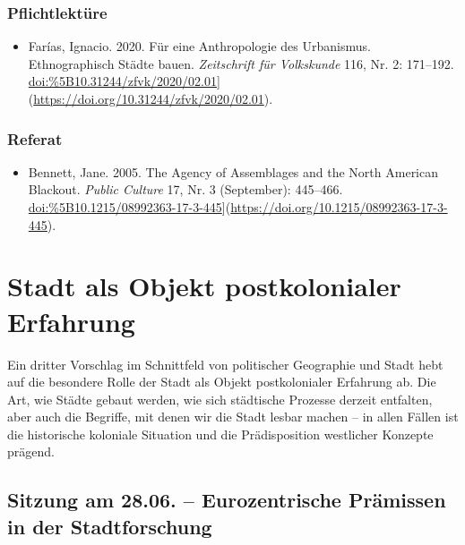 \documentclass[
]{article}
\providecommand{\tightlist}{%
  \setlength{\itemsep}{0pt}\setlength{\parskip}{0pt}}
\begin{document}
\hypertarget{pflichtlektuxfcre-8}{%
\subsubsection*{Pflichtlektüre}\label{pflichtlektuxfcre-8}}

\begin{itemize}
\tightlist
\item
  Farías, Ignacio. 2020. Für eine Anthropologie des Urbanismus. Ethnographisch Städte bauen. \emph{Zeitschrift für Volkskunde} 116, Nr. 2: 171--192. \url{doi:\%5B10.31244/zfvk/2020/02.01}{]}(\url{https://doi.org/10.31244/zfvk/2020/02.01}).
\end{itemize}

\hypertarget{referat-8}{%
\subsubsection*{Referat}\label{referat-8}}

\begin{itemize}
\tightlist
\item
  Bennett, Jane. 2005. The Agency of Assemblages and the North American Blackout. \emph{Public Culture} 17, Nr. 3 (September): 445--466. \url{doi:\%5B10.1215/08992363-17-3-445}{]}(\url{https://doi.org/10.1215/08992363-17-3-445}).
\end{itemize}

\pagebreak

\hypertarget{stadt-als-objekt-postkolonialer-erfahrung}{%
\section{Stadt als Objekt postkolonialer Erfahrung}\label{stadt-als-objekt-postkolonialer-erfahrung}}

Ein dritter Vorschlag im Schnittfeld von politischer Geographie und Stadt hebt auf die besondere Rolle der Stadt als Objekt postkolonialer Erfahrung ab. Die Art, wie Städte gebaut werden, wie sich städtische Prozesse derzeit entfalten, aber auch die Begriffe, mit denen wir die Stadt lesbar machen -- in allen Fällen ist die historische koloniale Situation und die Prädisposition westlicher Konzepte prägend.

\hypertarget{sitzung-am-28.06.-eurozentrische-pruxe4missen-in-der-stadtforschung}{%
\subsection{Sitzung am 28.06. -- Eurozentrische Prämissen in der Stadtforschung}\label{sitzung-am-28.06.-eurozentrische-pruxe4missen-in-der-stadtforschung}}
\end{document}
